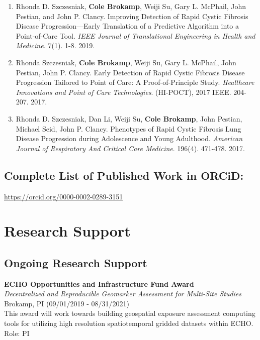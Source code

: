 \documentclass{nihbiosketch}
\begin{document}
\begin{enumerate}
\begin{enumerate}
	
	\item Rhonda D. Szczesniak, \textbf{Cole Brokamp}, Weiji Su, Gary L. McPhail,
    John Pestian, and John P. Clancy. Improving Detection of Rapid Cystic
    Fibrosis Disease Progression—Early Translation of a Predictive Algorithm
    into a Point-of-Care Tool. \textit{IEEE Journal of Translational Engineering
      in Health and Medicine.} 7(1). 1-8. 2019.

	\item Rhonda Szczesniak, \textbf{Cole Brokamp}, Weiji Su, Gary L. McPhail, John Pestian, John P. Clancy. Early Detection of Rapid Cystic Fibrosis Disease Progression Tailored to Point of Care: A Proof-of-Principle Study. \textit{Healthcare Innovations and Point of Care Technologies}. (HI-POCT), 2017 IEEE. 204-207. 2017.

	\item Rhonda D. Szczesniak, Dan Li, Weiji Su, \textbf{Cole Brokamp}, John Pestian, Michael Seid, John P. Clancy. Phenotypes of Rapid Cystic Fibrosis Lung Disease Progression during Adolescence and Young Adulthood. \textit{American Journal of Respiratory And Critical Care Medicine}. 196(4). 471-478. 2017.
	
\end{enumerate}

\end{enumerate}

\subsection*{Complete List of Published Work in ORCiD:} 
\url{https://orcid.org/0000-0002-0289-3151}

\section{Research Support}

\subsection*{Ongoing Research Support}

\bigskip

\textbf{ECHO Opportunities and Infrastructure Fund Award}\\
\emph{Decentralized and Reproducible Geomarker Assessment for Multi-Site
  Studies}\\
Brokamp, PI (09/01/2019 - 08/31/2021)\\
This award will work towards building geospatial exposure assessment
computing tools for utilizing high resolution spatiotemporal gridded
datasets within ECHO.\\
Role: PI
\end{document}
